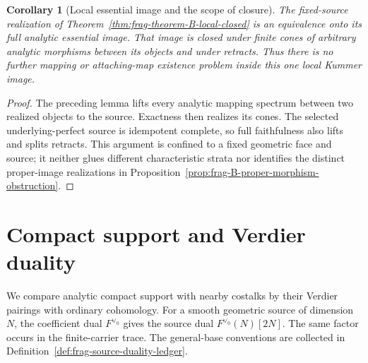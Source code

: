 \documentclass[11pt]{article}
\newtheorem{corollary}[theorem]{Corollary}
\theoremstyle{definition}
\theoremstyle{remark}
\begin{document}
\begin{corollary}[Local essential image and the scope of closure]
\label{cor:frag-B-local-essential-image}
The fixed-source realization of Theorem~\ref{thm:frag-theorem-B-local-closed} is an equivalence
onto its full analytic essential image.  That image is closed under
finite cones of arbitrary analytic morphisms between its objects
and under retracts.  Thus there is no further mapping or attaching-map
existence problem inside this one local Kummer image.
\end{corollary}

\begin{proof}
The preceding lemma lifts every analytic mapping spectrum between
two realized objects to the source.  Exactness then realizes its
cones.  The selected underlying-perfect source is idempotent complete,
so full faithfulness also lifts and splits retracts.  This argument
is confined to a fixed geometric face and source; it neither glues
different characteristic strata nor identifies the distinct
proper-image realizations in
Proposition~\ref{prop:frag-B-proper-morphism-obstruction}.
\end{proof}


\section{Compact support and Verdier duality}
\label{sec:frag-supported-realization}

We compare analytic compact support with nearby costalks by their
Verdier pairings with ordinary cohomology.  For a smooth geometric
source of dimension $N$, the coefficient dual $F^{\vee_0}$ gives the
source dual $F^{\vee_0}(N)[2N]$.  The same factor occurs in the
finite-carrier trace.  The general-base conventions are collected in
Definition~\ref{def:frag-source-duality-ledger}.
\end{document}
